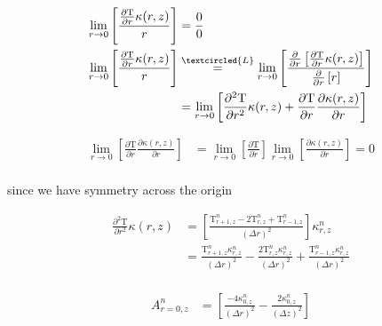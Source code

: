 \documentclass[12pt]{article}
\begin{document}
      \begin{equation}
        \begin{aligned}
          \lim_{r\rightarrow 0} \left [ \frac{\frac{\partial\mathrm{T}}{\partial r}\kappa(r, z)}{r} \right ] &= \frac{0}{0} \\
          \lim_{r\rightarrow 0} \left [ \frac{\frac{\partial\mathrm{T}}{\partial r}\kappa(r, z)}{r} \right ] &\overset{\textcircled{L}}= \lim_{r\rightarrow 0} \left [ \frac{\frac{\partial}{\partial r} \left [\frac{\partial\mathrm{T}}{\partial r}\kappa(r, z)  \right ]}{\frac{\partial}{\partial r}\left [ r \right ]} \right ] \\
          &= \lim_{r\rightarrow 0} \left [ \frac{\partial^2\mathrm{T}}{\partial r^2}\kappa(r, z)  + \frac{\partial\mathrm{T}}{\partial r}\frac{\partial\kappa(r, z)}{\partial r}\right ] \\
        \end{aligned}
      \end{equation}

      \begin{equation}
        \begin{aligned}
          \lim_{r\rightarrow 0} \left [ \frac{\partial\mathrm{T}}{\partial r}\frac{\partial\kappa(r, z)}{\partial r} \right ] &= \lim_{r\rightarrow 0} \left [ \frac{\partial\mathrm{T}}{\partial r}\right ] \lim_{r\rightarrow 0}\left [  \frac{\partial\kappa(r, z)}{\partial r} \right ] = 0 \\
        \end{aligned}
      \end{equation}
      
      since we have symmetry across the origin
      
      \begin{equation}
        \begin{aligned}
          \frac{\partial^2\mathrm{T}}{\partial r^2}\kappa(r, z) &= \left [\frac{\mathrm{T}^{n}_{r + 1, z}  - 2 \mathrm{T}^{n}_{r, z} +  \mathrm{T}^{n}_{r - 1, z}}{(\Delta r)^2} \right ] \kappa^n_{r, z} \\
           &= \frac{\mathrm{T}^n_{r + 1, z}\kappa^n_{r, z}}{(\Delta r)^2} - \frac{2 \mathrm{T}^n_{r, z}\kappa^n_{r,z}}{(\Delta r)^2} + \frac{\mathrm{T}^n_{r - 1, z}\kappa^n_{r,z}}{(\Delta r)^2}\\
        \end{aligned}
      \end{equation}

		\begin{equation}
      \begin{aligned}
        A^n_{r=0, z} &= \left [\frac{-4\kappa^n_{0, z}}{(\Delta r)^2} -\frac{2\kappa^n_{0, z}}{(\Delta z)^2}  \right ] \\
      \end{aligned}
		\end{equation}
		
\end{document}
